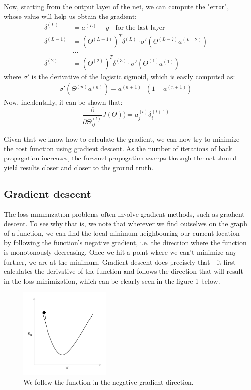 \documentclass[a4paper, 12pt]{article}
\numberwithin{equation}{section}
\begin{document}
	Now, starting from the output layer of the net, we can compute the "error", whose value will help us obtain the gradient:
	\begin{align}
	\delta^{(L)} &= a^{(L)} - y \quad \textrm{for the last layer} \\
	\delta^{(L-1)} &= (\Theta ^ {(L-1)})^T \delta^{(L)} \cdot \sigma'(\Theta^{(L-2)} a^{(L-2)}) \\
	&\ldots \\
	\delta^{(2)} &= (\Theta ^ {(2)})^T \delta^{(3)} \cdot \sigma'(\Theta^{(1)} a^{(1)})
	\end{align}
	where $\sigma'$ is the derivative of the logistic sigmoid, which is easily computed as:
	\begin{align}
	\sigma'(\Theta^{(n)} a^{(n)}) = a^{(n+1)} \cdot (1-a^{(n+1)})
	\end{align}
	Now, incidentally, it can be shown that:
	\begin{equation}
	\frac{\partial}{\partial \Theta_{ij}^{(l)}} J(\Theta)) = a_j^{(l)} \delta_i^{(l+1)}
	\end{equation}
	
	Given that we know how to calculate the gradient, we can now try to minimize the cost function using gradient descent. As the number of iterations of back propagation increases, the forward propagation sweeps through the net should yield results closer and closer to the ground truth.
	
	\subsection{Gradient descent}
	The loss minimization problems often involve gradient methods, such as gradient descent. To see why that is, we note that wherever we find outselves on the graph of a function, we can find the local minimum neighbouring our current location by following the function's negative gradient, i.e. the direction where the function is monotonously decreasing. Once we hit a point where we can't minimize any further, we are at the minimum. Gradient descent does precisely that - it first calculates the derivative of the function and follows the direction that will result in the loss minimization, which can be clearly seen in the figure \ref{fig:graddesc} below.
	
	\begin{figure}[!h]
		\centering
		\includegraphics[page=1,width=0.40\textwidth]{graddesc.pdf}
		\caption{\label{fig:graddesc}{We follow the function in the negative gradient direction.}}
	\end{figure}
	
\end{document}
